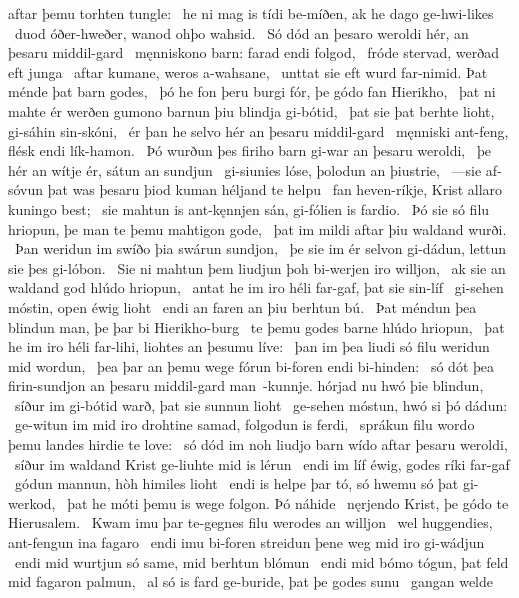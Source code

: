 aftar þemu torhten tungle: \hld\ he ni mag is tídi be-míðen,
ak he dago ge-hwi-likes \hld\ duod óðer-hweðer,
wanod ohþo wahsid. \hld\ Só dód an þesaro weroldi hér,
an þesaru middil-gard \hld\ męnniskono barn:
farad endi folgod, \hld\ fróde stervad,
werðad eft junga \hld\ aftar kumane,
weros a-wahsane, \hld\ unttat sie eft wurd far-nimid.
Þat ménde þat barn godes, \hld\ þó he fon þeru burgi fór,
þe gódo fan Hierikho, \hld\ þat ni mahte ér werðen gumono barnun
þiu blindja gi-bótid, \hld\ þat sie þat berhte lioht,
gi-sáhin sin-skóni, \hld\ ér þan he selvo hér
an þesaru middil-gard \hld\ męnniski ant-feng,
flésk endi lík-hamon. \hld\ Þó wurðun þes firiho barn
gi-war an þesaru weroldi, \hld\ þe hér an wítje ér,
sátun an sundjun \hld\ gi-siunies lóse,
þolodun an þiustrie, \hld\ —sie af-sóvun þat was þesaru þiod kuman
héljand te helpu \hld\ fan heven-ríkje,
Krist allaro kuningo best; \hld\ sie mahtun is ant-kęnnjen sán,
gi-fólien is fardio. \hld\ Þó sie só filu hriopun,
þe man te þemu mahtigon gode, \hld\ þat im mildi aftar þiu
waldand wurði. \hld\ Þan weridun im swíðo
þia swárun sundjon, \hld\ þe sie im ér selvon gi-dádun,
lettun sie þes gi-lóbon. \hld\ Sie ni mahtun þem liudjun þoh
bi-werjen iro willjon, \hld\ ak sie an waldand god
hlúdo hriopun, \hld\ antat he im iro héli far-gaf,
þat sie sin-líf \hld\ gi-sehen móstin,
open éwig lioht \hld\ endi an faren
an þiu berhtun bú. \hld\ Þat méndun þea blindun man,
þe þar bi Hierikho-burg \hld\ te þemu godes barne
hlúdo hriopun, \hld\ þat he im iro héli far-lihi,
liohtes an þesumu líve: \hld\ þan im þea liudi só filu
weridun mid wordun, \hld\ þea þar an þemu wege fórun
bi-foren endi bi-hinden: \hld\ só dót þea firin-sundjon
an þesaru middil-gard man\hld\ -kunnje.
hórjad nu hwó þie blindun, \hld\ síður im gi-bótid warð,
þat sie sunnun lioht \hld\ ge-sehen móstun,
hwó si þó dádun: \hld\ ge-witun im mid iro drohtine samad,
folgodun is ferdi, \hld\ sprákun filu wordo
þemu landes hirdie te love: \hld\ só dód im noh liudjo barn
wído aftar þesaru weroldi, \hld\ síður im waldand Krist
ge-liuhte mid is lérun \hld\ endi im líf éwig,
godes ríki far-gaf \hld\ gódun mannun,
hòh himiles lioht \hld\ endi is helpe þar tó,
só hwemu só þat gi-werkod, \hld\ þat he móti þemu is wege folgon.
Þó náhide \hld\ nęrjendo Krist,
þe gódo te Hierusalem. \hld\ Kwam imu þar te-gegnes filu
werodes an willjon \hld\ wel huggendies,
ant-fengun ina fagaro \hld\ endi imu bi-foren streidun
þene weg mid iro gi-wádjun \hld\ endi mid wurtjun só same,
mid berhtun blómun \hld\ endi mid bómo tógun,
þat feld mid fagaron palmun, \hld\ al só is fard ge-buride,
þat þe godes sunu \hld\ gangan welde
